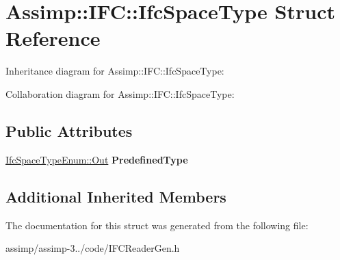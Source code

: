 \hypertarget{struct_assimp_1_1_i_f_c_1_1_ifc_space_type}{\section{Assimp\+:\+:I\+F\+C\+:\+:Ifc\+Space\+Type Struct Reference}
\label{struct_assimp_1_1_i_f_c_1_1_ifc_space_type}
}


Inheritance diagram for Assimp\+:\+:I\+F\+C\+:\+:Ifc\+Space\+Type\+:


Collaboration diagram for Assimp\+:\+:I\+F\+C\+:\+:Ifc\+Space\+Type\+:
\subsection*{Public Attributes}
\begin{DoxyCompactItemize}
\item 
\hypertarget{struct_assimp_1_1_i_f_c_1_1_ifc_space_type_a62e12d9a93b382a8ba7d26ed3f5fc5ba}{\hyperlink{classboost_1_1shared__ptr}{Ifc\+Space\+Type\+Enum\+::\+Out} {\bfseries Predefined\+Type}}\label{struct_assimp_1_1_i_f_c_1_1_ifc_space_type_a62e12d9a93b382a8ba7d26ed3f5fc5ba}

\end{DoxyCompactItemize}
\subsection*{Additional Inherited Members}


The documentation for this struct was generated from the following file\+:\begin{DoxyCompactItemize}
\item 
assimp/assimp-\/3../code/I\+F\+C\+Reader\+Gen.\+h\end{DoxyCompactItemize}

